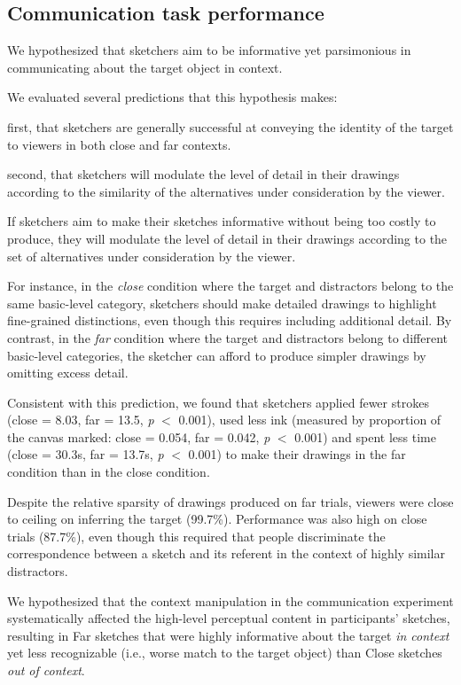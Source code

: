 \documentclass[9pt,twocolumn,twoside]{pnas-new}
\begin{document}
\subsection*{Communication task performance}

We hypothesized that sketchers aim to be informative yet parsimonious in communicating about the target object in context.

We evaluated several predictions that this hypothesis makes:

first, that sketchers are generally successful at conveying the identity of the target to viewers in both close and far contexts.


second, that sketchers will modulate the level of detail in their drawings according to the similarity of the alternatives under consideration by the viewer.

If sketchers aim to make their sketches informative without being too costly to produce, they will modulate the level of detail in their drawings according to the set of alternatives under consideration by the viewer.

For instance, in the \textit{close} condition where the target and distractors belong to the same basic-level category, sketchers should make detailed drawings to highlight fine-grained distinctions, even though this requires including additional detail. By contrast, in the \textit{far} condition where the target and distractors belong to different basic-level categories, the sketcher can afford to produce simpler drawings by omitting excess detail.

Consistent with this prediction, we found that sketchers applied fewer strokes (close = 8.03, far = 13.5, \textit{p} $<$ 0.001), used less ink (measured by proportion of the canvas marked: close = 0.054, far = 0.042, \textit{p} $<$ 0.001) and spent less time (close = 30.3s, far = 13.7s, \textit{p} $<$ 0.001) to make their drawings in the far condition than in the close condition.

Despite the relative sparsity of drawings produced on far trials, viewers were close to ceiling on inferring the target (99.7\%). Performance was also high on close trials (87.7\%), even though this required that people discriminate the correspondence between a sketch and its referent in the context of highly similar distractors.

We hypothesized that the context manipulation in the communication experiment systematically affected the high-level perceptual content in participants' sketches, resulting in Far sketches that were highly informative about the target \textit{in context} yet less recognizable (i.e., worse match to the target object) than Close sketches \textit{out of context}.
\end{document}
